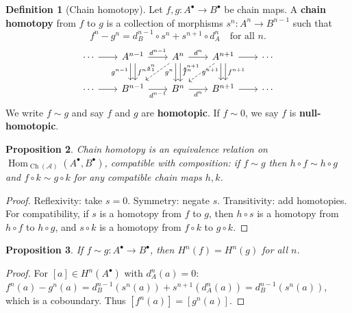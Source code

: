 \documentclass[a4paper,12pt]{book}
\DeclareMathOperator{\Hom}{Hom}
\theoremstyle{definition}
\newtheorem{definition}{Definition}[section]
\theoremstyle{plain}
\newtheorem{proposition}[definition]{Proposition}
\theoremstyle{remark}
\begin{document}
\begin{definition}[Chain homotopy]\label{def:chain-homotopy}
Let $f, g \colon A^\bullet \to B^\bullet$ be chain maps. A \textbf{chain homotopy}
from $f$ to $g$ is a collection of morphisms $s^n \colon A^n \to B^{n-1}$ such that
\[
    f^n - g^n = d_B^{n-1} \circ s^n + s^{n+1} \circ d_A^n \quad \text{for all } n.
\]
\[
\begin{tikzcd}[column sep=2em]
    \cdots \arrow[r] & A^{n-1} \arrow[r, "d^{n-1}"] \arrow[d, shift left=1, "f^{n-1}"]
    \arrow[d, shift right=1, "g^{n-1}"']
    & A^n \arrow[r, "d^n"] \arrow[d, shift left=1, "f^n"]
    \arrow[d, shift right=1, "g^n"'] \arrow[ld, dashed, "s^n"']
    & A^{n+1} \arrow[r] \arrow[d, shift left=1, "f^{n+1}"]
    \arrow[d, shift right=1, "g^{n+1}"'] \arrow[ld, dashed, "s^{n+1}"']
    & \cdots \\
    \cdots \arrow[r] & B^{n-1} \arrow[r, "d^{n-1}"'] & B^n \arrow[r, "d^n"'] & B^{n+1} \arrow[r] & \cdots
\end{tikzcd}
\]
We write $f \sim g$ and say $f$ and $g$ are \textbf{homotopic}.
If $f \sim 0$, we say $f$ is \textbf{null-homotopic}.
\end{definition}

\begin{proposition}\label{prop:homotopy-equiv-rel}
Chain homotopy is an equivalence relation on $\Hom_{\operatorname{Ch}(\mathcal{A})}(A^\bullet, B^\bullet)$,
compatible with composition: if $f \sim g$ then $h \circ f \sim h \circ g$ and
$f \circ k \sim g \circ k$ for any compatible chain maps $h, k$.
\end{proposition}

\begin{proof}
Reflexivity: take $s = 0$. Symmetry: negate $s$. Transitivity: add homotopies.
For compatibility, if $s$ is a homotopy from $f$ to $g$, then $h \circ s$ is a homotopy
from $h \circ f$ to $h \circ g$, and $s \circ k$ is a homotopy from $f \circ k$ to $g \circ k$.
\end{proof}

\begin{proposition}\label{prop:homotopic-cohomology}
If $f \sim g \colon A^\bullet \to B^\bullet$, then $H^n(f) = H^n(g)$ for all $n$.
\end{proposition}

\begin{proof}
For $[a] \in H^n(A^\bullet)$ with $d_A^n(a) = 0$:
$f^n(a) - g^n(a) = d_B^{n-1}(s^n(a)) + s^{n+1}(d_A^n(a)) = d_B^{n-1}(s^n(a))$,
which is a coboundary. Thus $[f^n(a)] = [g^n(a)]$.
\end{proof}
\end{document}

